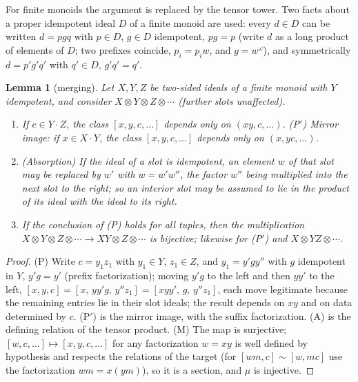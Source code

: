 \documentclass[11pt]{amsart}
\newtheorem{lem}[thm]{Lemma}
\theoremstyle{definition}
\begin{document}
For finite monoids the argument is replaced by the tensor tower. Two facts about
a proper idempotent ideal $D$ of a finite monoid are used: every $d\in D$ can be
written $d=pgq$ with $p\in D$, $g\in D$ idempotent, $pg=p$ (write $d$ as a long
product of elements of $D$; two prefixes coincide, $p_i=p_iw$, and $g=w^\omega$),
and symmetrically $d=p'g'q'$ with $q'\in D$, $g'q'=q'$.

\begin{lem}[merging]\label{lem:P}
Let $X,Y,Z$ be two-sided ideals of a finite monoid with $Y$ idempotent, and
consider $X\otimes Y\otimes Z\otimes\cdots$ (further slots unaffected).
\begin{enumerate}
\item[(P)] If $c\in Y\cdot Z$, the class $[x,y,c,\dots]$ depends only on
$(xy,c,\dots)$. (P$'$) Mirror image: if $x\in X\cdot Y$, the class
$[x,y,c,\dots]$ depends only on $(x,yc,\dots)$.
\item[(A)] (Absorption) If the ideal of a slot is idempotent, an element $w$
of that slot may be replaced by $w'$ with $w=w'w''$, the factor $w''$ being
multiplied into the next slot to the right; so an interior slot may be assumed
to lie in the product of its ideal with the ideal to its right.
\item[(M)] If the conclusion of (P) holds for all tuples, then the
multiplication $X\otimes Y\otimes Z\otimes\cdots\to XY\otimes Z\otimes\cdots$ is
bijective; likewise for (P$'$) and $X\otimes YZ\otimes\cdots$.
\end{enumerate}
\end{lem}
\begin{proof}
(P) Write $c=y_1z_1$ with $y_1\in Y$, $z_1\in Z$, and $y_1=y'gy''$ with $g$
idempotent in $Y$, $y'g=y'$ (prefix factorization); moving $y'g$ to the left
and then $yy'$ to the left,
$[x,y,c]=[x,\,yy'g,\,y''z_1]=[xyy',\,g,\,y''z_1]$, each move legitimate because
the remaining entries lie in their slot ideals; the result depends on $xy$ and
on data determined by $c$. (P$'$) is the mirror image, with the suffix
factorization. (A) is the defining relation of the tensor product. (M) The
map is surjective; $[w,c,\dots]\mapsto[x,y,c,\dots]$ for any factorization
$w=xy$ is well defined by hypothesis and respects the relations of the target
(for $[wm,c]\sim[w,mc]$ use the factorization $wm=x(ym)$), so it is a section,
and $\mu$ is injective.
\end{proof}
\end{document}

